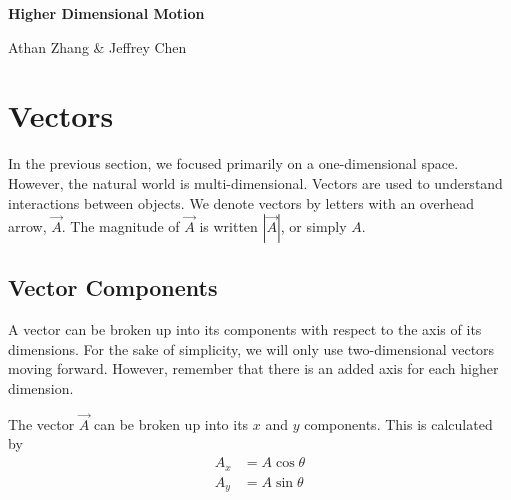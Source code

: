 \documentclass[11pt]{article}
\begin{document}
\textbf{\Huge Higher Dimensional Motion}

Athan Zhang \& Jeffrey Chen

\section{Vectors}

In the previous section, we focused primarily on a one-dimensional space. However, the natural world is multi-dimensional. Vectors are used to understand interactions between objects. We denote vectors by letters with an overhead arrow, $\Vec{A}$. The magnitude of $\Vec{A}$ is written $|\Vec{A}|$, or simply $A$.

\subsection{Vector Components}

A vector can be broken up into its components with respect to the axis of its dimensions. For the sake of simplicity, we will only use two-dimensional vectors moving forward. However, remember that there is an added axis for each higher dimension.

\begin{center}
\end{center}

The vector $\Vec{A}$ can be broken up into its $x$ and $y$ components. This is calculated by 
\begin{align*}
    A_{x} &= A\cos{\theta} \\
    A_{y} &= A\sin{\theta} \\
\end{align*}
\end{document}
